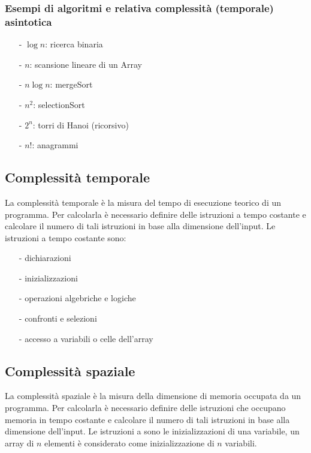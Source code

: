 \documentclass[a4paper]{article}
\begin{document}
\subsubsection*{Esempi di algoritmi e relativa complessità (temporale) asintotica}
\begin{itemize} [topsep=3pt, itemsep=0pt]
	\item[-] \(\log n\): ricerca binaria
	\item[-] \(n\): scansione lineare di un Array
	\item[-] \(n \log n\): mergeSort
	\item[-] \(n^2\): selectionSort
	\item[-] \(2^n\): torri di Hanoi (ricorsivo)
	\item[-] \(n!\): anagrammi
\end{itemize}

\subsection{Complessità temporale}
La complessità temporale è la misura del tempo di esecuzione teorico di un programma. Per calcolarla è necessario definire delle
istruzioni a tempo costante e calcolare il numero di tali istruzioni in base alla dimensione dell'input.
Le istruzioni a tempo costante sono:
\begin{itemize} [topsep=3pt, itemsep=0pt]
	\item[-] dichiarazioni
	\item[-] inizializzazioni
	\item[-] operazioni algebriche e logiche
	\item[-] confronti e selezioni
	\item[-] accesso a variabili o celle dell'array
\end{itemize}

\subsection{Complessità spaziale}
La complessità spaziale è la misura della dimensione di memoria occupata da un programma. Per calcolarla è necessario definire
delle istruzioni che occupano memoria in tempo costante e calcolare il numero di tali istruzioni in base alla dimensione dell'input.
Le istruzioni a  sono le inizializzazioni di una variabile, un array di \(n\) elementi è considerato come
inizializzazione di \(n\) variabili.

\newpage
\end{document}
